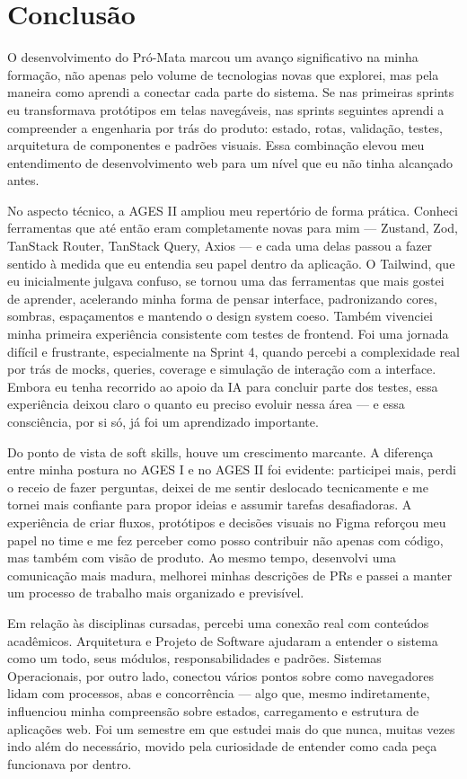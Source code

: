\section{Conclusão}

O desenvolvimento do Pró-Mata marcou um avanço significativo na minha
formação, não apenas pelo volume de tecnologias novas que explorei, mas
pela maneira como aprendi a conectar cada parte do sistema. Se nas
primeiras sprints eu transformava protótipos em telas navegáveis, nas
sprints seguintes aprendi a compreender a engenharia por trás do
produto: estado, rotas, validação, testes, arquitetura de componentes e
padrões visuais. Essa combinação elevou meu entendimento de
desenvolvimento web para um nível que eu não tinha alcançado antes.

No aspecto técnico, a AGES II ampliou meu repertório de forma prática.
Conheci ferramentas que até então eram completamente novas para mim ---
Zustand, Zod, TanStack Router, TanStack Query, Axios --- e cada uma
delas passou a fazer sentido à medida que eu entendia seu papel dentro
da aplicação. O Tailwind, que eu inicialmente julgava confuso, se tornou
uma das ferramentas que mais gostei de aprender, acelerando minha forma
de pensar interface, padronizando cores, sombras, espaçamentos e
mantendo o design system coeso. Também vivenciei minha primeira
experiência consistente com testes de frontend. Foi uma jornada difícil
e frustrante, especialmente na Sprint 4, quando percebi a complexidade
real por trás de mocks, queries, coverage e simulação de interação com a
interface. Embora eu tenha recorrido ao apoio da IA para concluir parte
dos testes, essa experiência deixou claro o quanto eu preciso evoluir
nessa área --- e essa consciência, por si só, já foi um aprendizado
importante.

Do ponto de vista de soft skills, houve um crescimento marcante. A
diferença entre minha postura no AGES I e no AGES II foi evidente:
participei mais, perdi o receio de fazer perguntas, deixei de me sentir
deslocado tecnicamente e me tornei mais confiante para propor ideias e
assumir tarefas desafiadoras. A experiência de criar fluxos, protótipos
e decisões visuais no Figma reforçou meu papel no time e me fez perceber
como posso contribuir não apenas com código, mas também com visão de
produto. Ao mesmo tempo, desenvolvi uma comunicação mais madura,
melhorei minhas descrições de PRs e passei a manter um processo de
trabalho mais organizado e previsível.

Em relação às disciplinas cursadas, percebi uma conexão real com
conteúdos acadêmicos. Arquitetura e Projeto de Software ajudaram a
entender o sistema como um todo, seus módulos, responsabilidades e
padrões. Sistemas Operacionais, por outro lado, conectou vários pontos
sobre como navegadores lidam com processos, abas e concorrência --- algo
que, mesmo indiretamente, influenciou minha compreensão sobre estados,
carregamento e estrutura de aplicações web. Foi um semestre em que
estudei mais do que nunca, muitas vezes indo além do necessário, movido
pela curiosidade de entender como cada peça funcionava por dentro.

